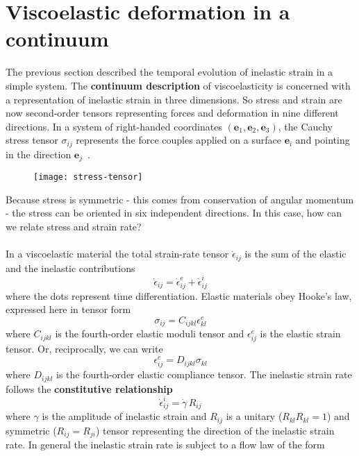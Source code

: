 \documentclass[letterpaper,12pt,]{memoir}
\begin{document}
\clearpage
\section{Viscoelastic deformation in a continuum}

The previous section described the temporal evolution of inelastic strain in a simple system. The \textbf{continuum description} of viscoelasticity is concerned with a representation of inelastic strain in three dimensions. So stress and strain are now second-order tensors representing forces and deformation in nine different directions. In a system of right-handed coordinates $(\textbf{e}_1, \textbf{e}_2, \textbf{e}_3)$, the Cauchy stress tensor $\sigma_{ij}$ represents the force couples applied on a surface $\textbf{e}_i$ and pointing in the direction $\textbf{e}_j$~\citep{malvern69a}.
%
\begin{figure}[h]
\centering
\texttt{[image: stress-tensor]}
\end{figure}
Because stress is symmetric - this comes from conservation of angular momentum - the stress can be oriented in six independent directions. In this case, how can we relate stress and strain rate? \\
\\
In a viscoelastic material the total strain-rate tensor $\dot{\epsilon}_{ij}$ is the sum of the elastic and the inelastic contributions
%
\begin{equation}\label{eqn:total-strain_gen}
\dot{\epsilon}_{ij}=\dot{\epsilon}_{ij}^e+\dot{\epsilon}_{ij}^i
\end{equation}
%
where the dots represent time differentiation. Elastic materials obey Hooke's law, expressed here in tensor form 
\begin{equation}
\sigma_{ij}=C_{ijkl}\epsilon_{kl}^e
\end{equation}
where $C_{ijkl}$ is the fourth-order elastic moduli tensor and $\epsilon_{ij}^e$ is the elastic strain tensor. Or, reciprocally, we can write
\begin{equation}
\epsilon_{ij}^e=D_{ijkl}\sigma_{kl}
\end{equation}
where $D_{ijkl}$ is the fourth-order elastic compliance tensor. The inelastic strain rate follows the \textbf{constitutive relationship}
\begin{equation}\label{eqn:plastic-constitutive_gen}
\dot{\epsilon}^i_{ij}=\dot{\gamma}\,R_{ij}
\end{equation}
where $\gamma$ is the amplitude of inelastic strain and $R_{ij}$ is a unitary ($R_{kl}R_{kl}=1$) and symmetric ($R_{ij}=R_{ji}$) tensor representing the direction of the inelastic strain rate. In general the inelastic strain rate is subject to a flow law of the form
\end{document}
